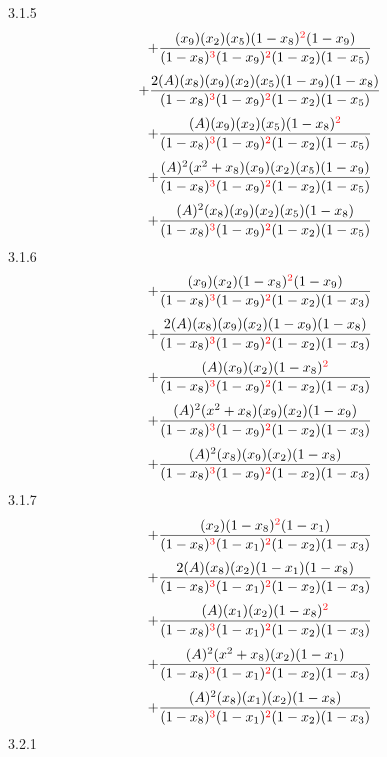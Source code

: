 \documentclass{article}
\begin{document}
3.1.5
\[+\frac{(x_9)(x_2)(x_5)(1-x_8)^{\textcolor{red}{2}}(1-x_9)}{(1-x_8)^{\textcolor{red}{3}}(1-x_9)^{\textcolor{red}{2}}(1-x_2)(1-x_5)}\]\[+\frac{2(A)(x_8)(x_9)(x_2)(x_5)(1-x_9)(1-x_8)}{(1-x_8)^{\textcolor{red}{3}}(1-x_9)^{\textcolor{red}{2}}(1-x_2)(1-x_5)}\]\[+\frac{(A)(x_9)(x_2)(x_5)(1-x_8)^{\textcolor{red}{2}}}{(1-x_8)^{\textcolor{red}{3}}(1-x_9)^{\textcolor{red}{2}}(1-x_2)(1-x_5)}\]\[+\frac{(A)^{2}(x^{2}+x_8)(x_9)(x_2)(x_5)(1-x_9)}{(1-x_8)^{\textcolor{red}{3}}(1-x_9)^{\textcolor{red}{2}}(1-x_2)(1-x_5)}\]\[+\frac{(A)^{2}(x_8)(x_9)(x_2)(x_5)(1-x_8)}{(1-x_8)^{\textcolor{red}{3}}(1-x_9)^{\textcolor{red}{2}}(1-x_2)(1-x_5)}\]
3.1.6
\[+\frac{(x_9)(x_2)(1-x_8)^{\textcolor{red}{2}}(1-x_9)}{(1-x_8)^{\textcolor{red}{3}}(1-x_9)^{\textcolor{red}{2}}(1-x_2)(1-x_3)}\]\[+\frac{2(A)(x_8)(x_9)(x_2)(1-x_9)(1-x_8)}{(1-x_8)^{\textcolor{red}{3}}(1-x_9)^{\textcolor{red}{2}}(1-x_2)(1-x_3)}\]\[+\frac{(A)(x_9)(x_2)(1-x_8)^{\textcolor{red}{2}}}{(1-x_8)^{\textcolor{red}{3}}(1-x_9)^{\textcolor{red}{2}}(1-x_2)(1-x_3)}\]\[+\frac{(A)^{2}(x^{2}+x_8)(x_9)(x_2)(1-x_9)}{(1-x_8)^{\textcolor{red}{3}}(1-x_9)^{\textcolor{red}{2}}(1-x_2)(1-x_3)}\]\[+\frac{(A)^{2}(x_8)(x_9)(x_2)(1-x_8)}{(1-x_8)^{\textcolor{red}{3}}(1-x_9)^{\textcolor{red}{2}}(1-x_2)(1-x_3)}\]
3.1.7
\[+\frac{(x_2)(1-x_8)^{\textcolor{red}{2}}(1-x_1)}{(1-x_8)^{\textcolor{red}{3}}(1-x_1)^{\textcolor{red}{2}}(1-x_2)(1-x_3)}\]\[+\frac{2(A)(x_8)(x_2)(1-x_1)(1-x_8)}{(1-x_8)^{\textcolor{red}{3}}(1-x_1)^{\textcolor{red}{2}}(1-x_2)(1-x_3)}\]\[+\frac{(A)(x_1)(x_2)(1-x_8)^{\textcolor{red}{2}}}{(1-x_8)^{\textcolor{red}{3}}(1-x_1)^{\textcolor{red}{2}}(1-x_2)(1-x_3)}\]\[+\frac{(A)^{2}(x^{2}+x_8)(x_2)(1-x_1)}{(1-x_8)^{\textcolor{red}{3}}(1-x_1)^{\textcolor{red}{2}}(1-x_2)(1-x_3)}\]\[+\frac{(A)^{2}(x_8)(x_1)(x_2)(1-x_8)}{(1-x_8)^{\textcolor{red}{3}}(1-x_1)^{\textcolor{red}{2}}(1-x_2)(1-x_3)}\]
3.2.1
\end{document}
